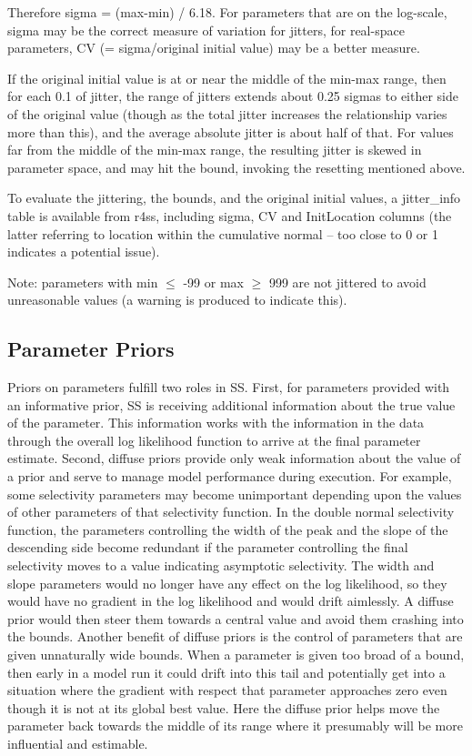 Therefore sigma = (max-min) / 6.18. For parameters that are on the log-scale, sigma may be the correct measure of variation for jitters, for real-space parameters, CV (= sigma/original initial value) may be a better measure. 

If the original initial value is at or near the middle of the min-max range, then for each 0.1 of jitter, the range of jitters extends about 0.25 sigmas to either side of the original value (though as the total jitter increases the relationship varies more than this), and the average absolute jitter is about half of that.  For values far from the middle of the min-max range, the resulting jitter is skewed in parameter space, and may hit the bound, invoking the resetting mentioned above. 

To evaluate the jittering, the bounds, and the original initial values, a jitter\_info table is available from r4ss, including sigma, CV and InitLocation columns (the latter referring to location within the cumulative normal – too close to 0 or 1 indicates a potential issue).

Note: parameters with min $\leq$ -99 or max $\geq$ 999 are not jittered to avoid unreasonable values (a warning is produced to indicate this).

\hypertarget{PriorDescrip}{}
\subsection{Parameter Priors}
Priors on parameters fulfill two roles in SS.  First, for parameters provided with an informative prior, SS is receiving additional information about the true value of the parameter.  This information works with the information in the data through the overall log likelihood function to arrive at the final parameter estimate.  Second, diffuse priors provide only weak information about the value of a prior and serve to manage model performance during execution.  For example, some selectivity parameters may become unimportant depending upon the values of other parameters of that selectivity function.  In the double normal selectivity function, the parameters controlling the width of the peak and the slope of the descending side become redundant if the parameter controlling the final selectivity moves to a value indicating asymptotic selectivity.  The width and slope parameters would no longer have any effect on the log likelihood, so they would have no gradient in the log likelihood and would drift aimlessly.  A diffuse prior would then steer them towards a central value and avoid them crashing into the bounds.  Another benefit of diffuse priors is the control of parameters that are given unnaturally wide bounds.  When a parameter is given too broad of a bound, then early in a model run it could drift into this tail and potentially get into a situation where the gradient with respect that parameter approaches zero even though it is not at its global best value.  Here the diffuse prior helps move the parameter back towards the middle of its range where it presumably will be more influential and estimable.  

